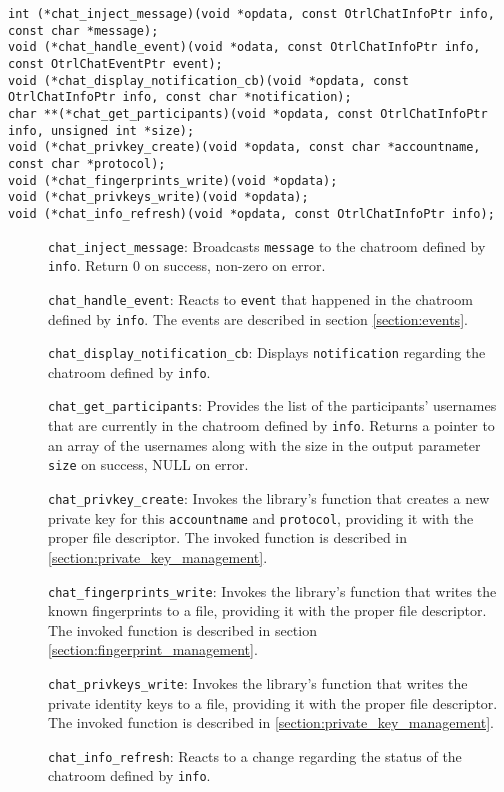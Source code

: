 \begin{lstlisting}
int (*chat_inject_message)(void *opdata, const OtrlChatInfoPtr info, const char *message);
void (*chat_handle_event)(void *odata, const OtrlChatInfoPtr info, const OtrlChatEventPtr event);
void (*chat_display_notification_cb)(void *opdata, const OtrlChatInfoPtr info, const char *notification);
char **(*chat_get_participants)(void *opdata, const OtrlChatInfoPtr info, unsigned int *size);
void (*chat_privkey_create)(void *opdata, const char *accountname, const char *protocol);
void (*chat_fingerprints_write)(void *opdata);
void (*chat_privkeys_write)(void *opdata);
void (*chat_info_refresh)(void *opdata, const OtrlChatInfoPtr info);
\end{lstlisting}

\begin{description}
  \item[] \texttt{chat\_inject\_message}: Broadcasts \texttt{message} to the chatroom defined by \texttt{info}. Return 0 on success, non-zero on error.

  \item[] \texttt{chat\_handle\_event}: Reacts to \texttt{event} that happened in the chatroom defined by \texttt{info}. The events are described in section \ref{section:events}.

  \item[] \texttt{chat\_display\_notification\_cb}: Displays \texttt{notification} regarding the chatroom defined by \texttt{info}.
  
  \item[] \texttt{chat\_get\_participants}: Provides the list of the participants' usernames that are currently in the chatroom defined by \texttt{info}. Returns a pointer to an array of the usernames along with the size in the output parameter \texttt{size} on success, NULL on error.
    
  \item[] \texttt{chat\_privkey\_create}: Invokes the library's function that creates a new private key for this \texttt{accountname} and \texttt{protocol}, providing it with the proper file descriptor. The invoked function is described in \ref{section:private_key_management}.

  \item[] \texttt{chat\_fingerprints\_write}: Invokes the library's function that writes the known fingerprints to a file, providing it with the proper file descriptor. The invoked function is described in section \ref{section:fingerprint_management}.
  
  \item[] \texttt{chat\_privkeys\_write}: Invokes the library's function that writes the private identity keys to a file, providing it with the proper file descriptor. The invoked function is described in \ref{section:private_key_management}.

  \item[] \texttt{chat\_info\_refresh}: Reacts to a change regarding the status of the chatroom defined by \texttt{info}.
  
\end{description}


